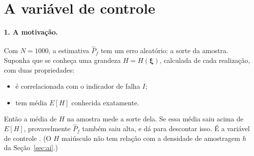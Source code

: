 \documentclass[11pt,a4paper]{article}
\newcommand{\xib}{\bm\xi}
\begin{document}
\section{A variável de controle}\label{sec:controle}
\paragraph{1. A motivação.} Com $N = 1000$, a estimativa $\hat P_f$ tem um erro aleatório: a sorte da amostra. Suponha
que se conheça uma grandeza $H = H(\xib)$, calculada de cada realização, com duas propriedades:
\begin{itemize}
  \item é correlacionada com o indicador de falha $I$;
  \item tem média $E[H]$ conhecida exatamente.
\end{itemize}
Então a média de $H$ na amostra mede a sorte dela. Se essa média saiu acima de $E[H]$, provavelmente $\hat P_f$ também
saiu alta, e dá para descontar isso. É a variável de controle \citep[Seç.~4.1]{glasserman2004}. (O $H$ maiúsculo não tem
relação com a densidade de amostragem $h$ da Seção~\ref{sec:ai}.)
\end{document}
